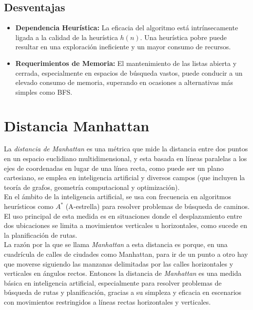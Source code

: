 \subsection*{Desventajas}
\begin{itemize}
    \item \textbf{Dependencia Heurística:} La eficacia del algoritmo está intrínsecamente ligada 
                a la calidad de la heurística \(h(n)\). Una heurística pobre puede resultar en 
                una exploración ineficiente y un mayor consumo de recursos.
    \item \textbf{Requerimientos de Memoria:} El mantenimiento de las listas abierta y cerrada,
                especialmente en espacios de búsqueda vastos, puede conducir a un elevado 
                consumo de memoria, superando en ocasiones a alternativas más simples como BFS.
\end{itemize}

\section{Distancia Manhattan}

La \textit{distancia de Manhattan} es una métrica que mide la distancia entre dos puntos en un espacio 
euclidiano multidimensional, y esta basada en líneas paralelas a los ejes de coordenadas en lugar de 
una línea recta, como puede ser un plano cartesiano, se emplea en inteligencia artificial y diversos 
campos (que incluyen la teoría de grafos, geometría computacional y optimización).\\ 


En el ámbito de la inteligencia artificial, se usa con frecuencia en algoritmos heurísticos como $A^{*}$ 
(A-estrella) para resolver problemas de búsqueda de caminos. El uso principal de esta medida es en 
situaciones donde el desplazamiento entre dos ubicaciones se limita a movimientos verticales u 
horizontales, como sucede en la planificación de rutas.\\ 


La razón por la que se llama \textit{Manhattan} a esta distancia es porque, en una cuadrícula de calles 
de ciudades como Manhattan, para ir de un punto a otro hay que moverse siguiendo las manzanas 
delimitadas por las calles horizontales y verticales en ángulos rectos. Entonces la distancia de 
\textit{Manhattan} es una medida básica en inteligencia artificial, especialmente para resolver 
problemas de búsqueda de rutas y planificación, gracias a su simpleza y eficacia en escenarios con 
movimientos restringidos a líneas rectas horizontales y verticales.\\ 


